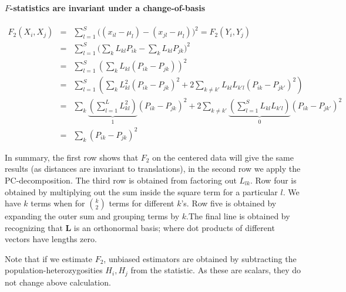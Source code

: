 \documentclass[12pt,fullpage, a4paper]{article}
\newcommand{\ML}{\mathbf{L}} %
\begin{document}
\paragraph{$F$-statistics are invariant under a change-of-basis}
\begin{eqnarray}
F_2(X_i, X_j) &=& \sum_{l=1}^S \big( (x_{il} - \mu_l) -(x_{jl} -\mu_l)\big)^2 = F_2(Y_i, Y_j)\nonumber\\
&=& \sum_{l=1}^S \big( \sum_k L_{kl}P_{ik} - \sum_kL_{kl}P_{jk}\big)^2\nonumber\\
&=& \sum_{l=1}^S \left( \sum_k L_{kl} (P_{ik} -P_{jk}) \right)^2\nonumber\\
&=& \sum_{l=1}^S \left( \sum_k L_{kl}^2 (P_{ik} -P_{jk})^2 + 2\sum_{k\neq k'} L_{kl}L_{k'l}(P_{ik} - P_{jk'})^2 \right)\nonumber\\
&=& \sum_k \underbrace{\left(\sum_{l=1}^L L_{kl}^2\right)}_1 (P_{ik} -P_{jk})^2 + 2\sum_{k\neq k'}\underbrace{\left(\sum_{l=1}^S L_{kl}L_{k'l}\right)}_{0} (P_{ik} - P_{jk'})^2\nonumber\\
&=& \sum_k (P_{ik} - P_{jk})^2 \label{eq:changeofbasis}
\end{eqnarray}

In summary, the first row shows that $F_2$ on the centered data will give the same results (as distances are invariant to translations), in the second row we apply the PC-decomposition. The third row is obtained from factoring out $L_{lk}$. Row four is obtained by multiplying out the sum inside the square term for a particular $l$. We have $k$ terms when for $\binom{k}{2}$ terms for different $k$'s.  Row five is obtained by expanding the outer sum and grouping terms by $k$.The final line is obtained by recognizing that $\ML$ is an orthonormal basis; where dot products of different vectors have lengths zero.

Note that if we estimate $F_2$, unbiased estimators are obtained by subtracting the population-heterozygosities $H_i, H_j$ from the statistic. As these are scalars, they do not change above calculation.
\end{document}
